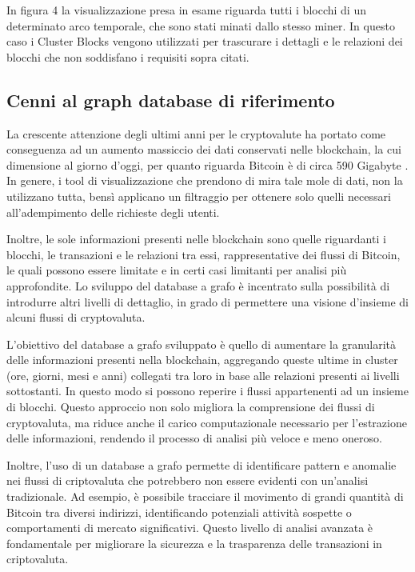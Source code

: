 In figura 4 la visualizzazione presa in esame riguarda tutti i blocchi di un determinato arco temporale, che sono stati minati dallo stesso miner.
In questo caso i Cluster Blocks vengono utilizzati per trascurare i dettagli e le relazioni dei blocchi che non soddisfano i requisiti sopra citati. 


\subsection{Cenni al graph database di riferimento}
La crescente attenzione degli ultimi anni per le cryptovalute ha portato come conseguenza ad un aumento massiccio dei dati conservati nelle blockchain, la cui dimensione al giorno d'oggi, per quanto riguarda Bitcoin è di circa 590 Gigabyte \cite{blockchair}.
In genere, i tool di visualizzazione che prendono di mira tale mole di dati, non la utilizzano tutta, bensì applicano un filtraggio per ottenere solo quelli necessari all'adempimento delle richieste degli utenti.

Inoltre, le sole informazioni presenti nelle blockchain sono quelle riguardanti i blocchi, le transazioni e le relazioni tra essi, rappresentative dei flussi di Bitcoin, le quali possono essere limitate e in certi casi limitanti per analisi più approfondite.
Lo sviluppo del database a grafo è incentrato sulla possibilità di introdurre altri livelli di dettaglio, in grado di permettere una visione d'insieme di alcuni flussi di cryptovaluta.

L'obiettivo del database a grafo sviluppato è quello di aumentare la granularità delle informazioni presenti nella blockchain, aggregando queste ultime in cluster (ore, giorni, mesi e anni) collegati tra loro in base alle relazioni presenti ai livelli sottostanti.
In questo modo si possono reperire i flussi appartenenti ad un insieme di blocchi.
Questo approccio non solo migliora la comprensione dei flussi di cryptovaluta, ma riduce anche il carico computazionale necessario per l’estrazione delle informazioni, rendendo il processo di analisi più veloce e meno oneroso.

Inoltre, l’uso di un database a grafo permette di identificare pattern e anomalie nei flussi di criptovaluta che potrebbero non essere evidenti con un’analisi tradizionale. Ad esempio, è possibile tracciare il movimento di grandi quantità di Bitcoin tra diversi indirizzi, identificando potenziali attività sospette o comportamenti di mercato significativi. Questo livello di analisi avanzata è fondamentale per migliorare la sicurezza e la trasparenza delle transazioni in criptovaluta.

\thispagestyle{mystyle}




